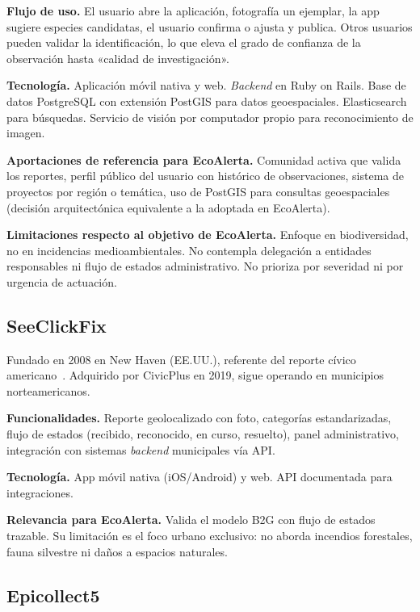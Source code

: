 \textbf{Flujo de uso.}  El usuario abre la aplicación, fotografía un ejemplar, la app sugiere especies candidatas, el usuario confirma o ajusta y publica. Otros usuarios pueden validar la identificación, lo que eleva el grado de confianza de la observación hasta «calidad de investigación».

\textbf{Tecnología.}  Aplicación móvil nativa y web. \textit{Backend} en Ruby on Rails. Base de datos PostgreSQL con extensión PostGIS para datos geoespaciales. Elasticsearch para búsquedas. Servicio de visión por computador propio para reconocimiento de imagen.

\textbf{Aportaciones de referencia para EcoAlerta.}  Comunidad activa que valida los reportes, perfil público del usuario con histórico de observaciones, sistema de proyectos por región o temática, uso de PostGIS para consultas geoespaciales (decisión arquitectónica equivalente a la adoptada en EcoAlerta).

\textbf{Limitaciones respecto al objetivo de EcoAlerta.}  Enfoque en biodiversidad, no en incidencias medioambientales. No contempla delegación a entidades responsables ni flujo de estados administrativo. No prioriza por severidad ni por urgencia de actuación.


\subsection{SeeClickFix}
\label{subsec:seeclickfix}

Fundado en 2008 en New Haven (EE.UU.), referente del reporte cívico americano~\parencite{seeclickfix}. Adquirido por CivicPlus en 2019, sigue operando en municipios norteamericanos.

\textbf{Funcionalidades.}  Reporte geolocalizado con foto, categorías estandarizadas, flujo de estados (recibido, reconocido, en curso, resuelto), panel administrativo, integración con sistemas \textit{backend} municipales vía API.

\textbf{Tecnología.}  App móvil nativa (iOS/Android) y web. API documentada para integraciones.

\textbf{Relevancia para EcoAlerta.}  Valida el modelo B2G con flujo de estados trazable. Su limitación es el foco urbano exclusivo: no aborda incendios forestales, fauna silvestre ni daños a espacios naturales.


\subsection{Epicollect5}
\label{subsec:epicollect}

